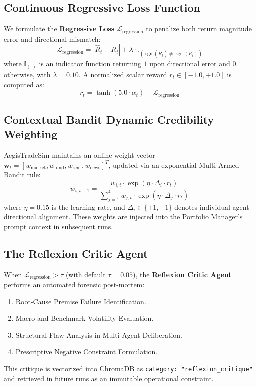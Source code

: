 \documentclass[conference]{IEEEtran}
\begin{document}
\subsection{Continuous Regressive Loss Function}
We formulate the \textbf{Regressive Loss} $\mathcal{L}_{\text{regression}}$ to penalize both return magnitude error and directional mismatch:
\begin{equation}
\mathcal{L}_{\text{regression}} = |\hat{R}_t - R_t| + \lambda \cdot \mathbb{I}_{(\operatorname{sgn}(\hat{R}_t) \neq \operatorname{sgn}(R_t))}
\end{equation}
where $\mathbb{I}_{(\cdot)}$ is an indicator function returning $1$ upon directional error and $0$ otherwise, with $\lambda = 0.10$. A normalized scalar reward $r_t \in [-1.0, +1.0]$ is computed as:
\begin{equation}
r_t = \tanh \left( 5.0 \cdot \alpha_t \right) - \mathcal{L}_{\text{regression}}
\end{equation}

\subsection{Contextual Bandit Dynamic Credibility Weighting}
AegisTradeSim maintains an online weight vector $\mathbf{w}_t = [w_{\text{market}}, w_{\text{fund}}, w_{\text{sent}}, w_{\text{news}}]^T$, updated via an exponential Multi-Armed Bandit rule:
\begin{equation}
w_{i, t+1} = \frac{w_{i, t} \cdot \exp\left( \eta \cdot \Delta_i \cdot r_t \right)}{\sum_{j=1}^4 w_{j, t} \cdot \exp\left( \eta \cdot \Delta_j \cdot r_t \right)}
\end{equation}
where $\eta = 0.15$ is the learning rate, and $\Delta_i \in \{+1, -1\}$ denotes individual agent directional alignment. These weights are injected into the Portfolio Manager's prompt context in subsequent runs.

\subsection{The Reflexion Critic Agent}
When $\mathcal{L}_{\text{regression}} > \tau$ (with default $\tau = 0.05$), the \textbf{Reflexion Critic Agent} performs an automated forensic post-mortem:
\begin{enumerate}
    \item Root-Cause Premise Failure Identification.
    \item Macro and Benchmark Volatility Evaluation.
    \item Structural Flaw Analysis in Multi-Agent Deliberation.
    \item Prescriptive Negative Constraint Formulation.
\end{enumerate}
This critique is vectorized into ChromaDB as \texttt{category: "reflexion\_critique"} and retrieved in future runs as an immutable operational constraint.
\end{document}
